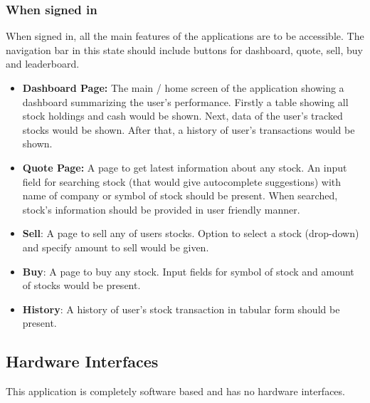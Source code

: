 \documentclass[12 pt, a4paper]{report}
\begin{document}
	\subsubsection{When signed in}
	When signed in, all the main features of the applications are to be accessible. The navigation bar in this state should include buttons for dashboard, quote, sell, buy and leaderboard.
	\begin{itemize}
		\item \textbf{Dashboard Page:} The main / home screen of the application showing a dashboard summarizing the user's performance. Firstly a table showing all stock holdings and cash would be shown. Next, data of the user's tracked stocks would  be shown. After that, a history of user's transactions would be shown.
		\item \textbf{Quote Page: } A page to get latest information about any stock. An input field for searching stock (that would give autocomplete suggestions) with name of company or symbol of stock should be present. When searched, stock's information should be provided in user friendly manner.
		\item \textbf{Sell}: A page to sell any of users stocks. Option to select a stock (drop-down) and specify amount to sell would be given.
		\item \textbf{Buy}: A page to buy any stock. Input fields for symbol of stock and amount of stocks would be present.
		\item \textbf{History}: A history of user's stock transaction in tabular form should be present.
	\end{itemize}
	
	\subsection {Hardware Interfaces}
	This application is completely software based and has no hardware interfaces.
	
\end{document}
